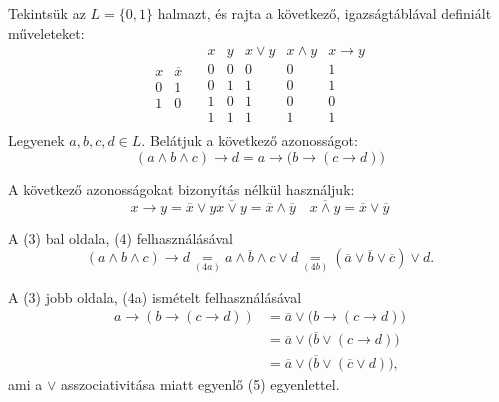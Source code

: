 \documentclass{article}
\begin{document}
    Tekintsük az $L = \{0, 1\}$ halmazt, és rajta a következő, igazságtáblával definiált műveleteket:
    \[
    \begin{array}{c||c}
        x & \overline{x} \\ \hline
        0 & 1 \\
        1 & 0
    \end{array}
    \quad
    \begin{array}{cc||c|c|c}
        x & y & x \vee y  & x \wedge y  & x \rightarrow y \\ \hline
        0 & 0 & 0 & 0 & 1 \\
        0 & 1 & 1 & 0 & 1 \\
        1 & 0 & 1 & 0 & 0 \\
        1 & 1 & 1 & 1 & 1 \\
    \end{array}
    \]
    Legyenek $a, b, c, d \in L.$ Belátjuk a következő azonosságot:
    \begin{equation}
        (a \wedge b \wedge c) \rightarrow d = a \rightarrow \bigl(b \rightarrow (c \rightarrow d)\bigr)
    \end{equation}
    
    A következő azonosságokat bizonyítás nélkül használjuk:
    \begin{subequations}
        \begin{equation}
            x \rightarrow y = \overline{x} \vee y
        \end{equation}
        \begin{equation}
            \overline{x \vee y} = \overline{x} \wedge \overline{y} 
            \quad
            \overline{x \wedge y} = \overline{x} \vee \overline{y}
        \end{equation}
    \end{subequations}
    
    A (3) bal oldala, (4) felhasználásával
    \begin{equation}
        (a \wedge b \wedge c) \rightarrow d \underset{(4a)}{=} \overline{a \wedge b \wedge c} \vee d \underset{(4b)}{=} (\overline{a} \vee \overline{b} \vee \overline{c}) \vee d.
    \end{equation}
        
    A (3) jobb oldala, (4a) ismételt felhasználásával
    \begin{align}
        \nonumber a \rightarrow (b \rightarrow (c \rightarrow d)) &= \overline{a} \vee \bigl(b \rightarrow (c \rightarrow d)\bigr) \\
        &= \overline{a} \vee \bigl(\overline{b} \vee (c \rightarrow d)\bigr) \\
        \nonumber &= \overline{a} \vee \bigl(\overline{b} \vee (\overline{c} \vee d)\bigr),
    \end{align}
    ami a $\vee$ asszociativitása miatt egyenlő (5) egyenlettel.
    
\end{document}
